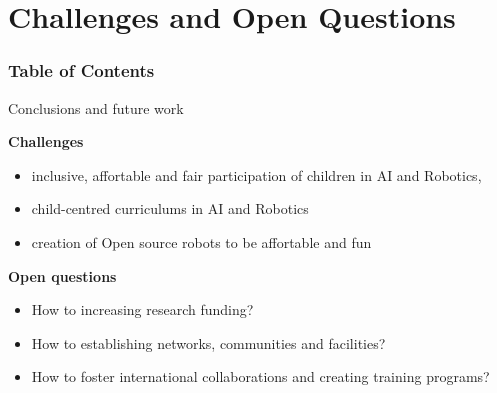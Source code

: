\section{Challenges and Open Questions}


\begin{frame}
      \frametitle{Table of Contents}
      \tableofcontents[currentsection]
\end{frame}



{
\begin{frame}{Conclusions and future work}

\textbf{Challenges}   

\begin{itemize}
\item inclusive, affortable and fair participation of children in AI and Robotics,
\item child-centred curriculums in AI and Robotics 
\item creation of Open source robots to be affortable and fun 
\end{itemize}

\textbf{Open questions}
\begin{itemize}
\item How to increasing research funding?
\item How to establishing networks, communities and facilities?
\item How to foster international collaborations and creating training programs?
\end{itemize}




\end{frame}
}


